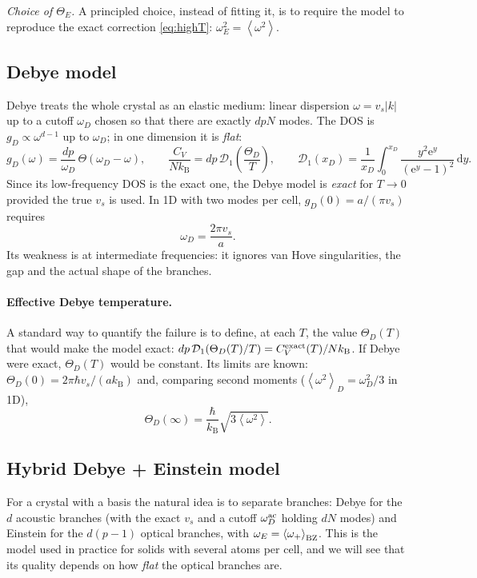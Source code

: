 \documentclass[11pt,a4paper]{article}
\newcommand{\kB}{k_{\mathrm B}}
\newcommand{\dd}{\mathrm{d}}
\newcommand{\ee}{\mathrm{e}}
\newcommand{\avg}[1]{\left\langle #1\right\rangle}
\newcommand{\vs}{v_{s}}
\begin{document}
\emph{Choice of $\Theta_E$.} A principled choice, instead of fitting it, is to
require the model to reproduce the exact correction \eqref{eq:highT}:
$\omega_E^2=\avg{\omega^2}$.

\subsection{Debye model}

Debye treats the whole crystal as an elastic medium: linear dispersion
$\omega=\vs|k|$ up to a cutoff $\omega_D$ chosen so that there are exactly
$dpN$ modes. The DOS is $g_D\propto\omega^{d-1}$ up to $\omega_D$; in one
dimension it is \emph{flat}:
\begin{equation}
g_D(\omega)=\frac{dp}{\omega_D}\,\Theta(\omega_D-\omega),\qquad
\frac{C_V}{N\kB}=dp\,\mathcal D_1\!\left(\frac{\Theta_D}{T}\right),\qquad
\mathcal D_1(x_D)=\frac{1}{x_D}\int_0^{x_D}\frac{y^2\ee^y}{(\ee^y-1)^2}\,\dd y .
\end{equation}
Since its low-frequency DOS is the exact one, the Debye model is \emph{exact}
for $T\to0$ provided the true $\vs$ is used. In 1D with two modes per cell,
$g_D(0)=a/(\pi\vs)$ requires
\begin{equation}
\omega_D=\frac{2\pi\vs}{a}.
\end{equation}
Its weakness is at intermediate frequencies: it ignores van Hove singularities,
the gap and the actual shape of the branches.

\paragraph{Effective Debye temperature.} A standard way to quantify the failure
is to define, at each $T$, the value $\Theta_D(T)$ that would make the model
exact: $dp\,\mathcal D_1(\Theta_D(T)/T)=C_V^{\rm exact}(T)/N\kB$. If Debye were
exact, $\Theta_D(T)$ would be constant. Its limits are known:
$\Theta_D(0)=2\pi\hbar\vs/(a\kB)$ and, comparing second moments
($\avg{\omega^2}_D=\omega_D^2/3$ in 1D),
\begin{equation}
\Theta_D(\infty)=\frac{\hbar}{\kB}\sqrt{3\avg{\omega^2}} .
\end{equation}

\subsection{Hybrid Debye + Einstein model}

For a crystal with a basis the natural idea is to separate branches: Debye for
the $d$ acoustic branches (with the exact $\vs$ and a cutoff
$\omega_D^{\rm ac}$ holding $dN$ modes) and Einstein for the $d(p-1)$ optical
branches, with $\omega_E=\avg{\omega_+}_{\rm BZ}$. This is the model used in
practice for solids with several atoms per cell, and we will see that its
quality depends on how \emph{flat} the optical branches are.
\end{document}
